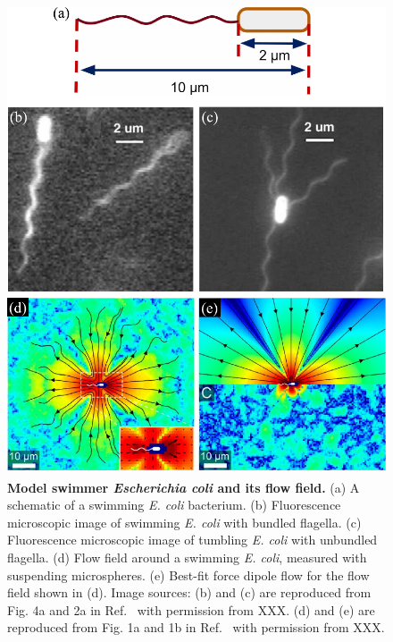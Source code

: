 \begin{figure}[!ht]
	\begin{center}
	\includegraphics[height=5.5in]{Figs/2-Exp/1.pdf}
	\end{center}
	\caption[Model swimmer \textit{Escherichia coli} and its flow field]
	{
	\textbf{Model swimmer \textit{Escherichia coli} and its flow field.}
  (a) A schematic of a swimming \textit{E. coli} bacterium.
  (b) Fluorescence microscopic image of swimming \textit{E. coli} with bundled flagella.
  (c) Fluorescence microscopic image of tumbling \textit{E. coli} with unbundled flagella.
  (d) Flow field around a swimming \textit{E. coli}, measured with suspending microspheres.
  (e) Best-fit force dipole flow for the flow field shown in (d).
  Image sources:
  (b) and (c) are reproduced from Fig. 4a and 2a in Ref.~\cite{Turner2000} with permission from XXX.
  (d) and (e) are reproduced from Fig. 1a and 1b in Ref.~\cite{Drescher2011} with permission from XXX.
	}
	\label{fig:2-1}
\end{figure}

